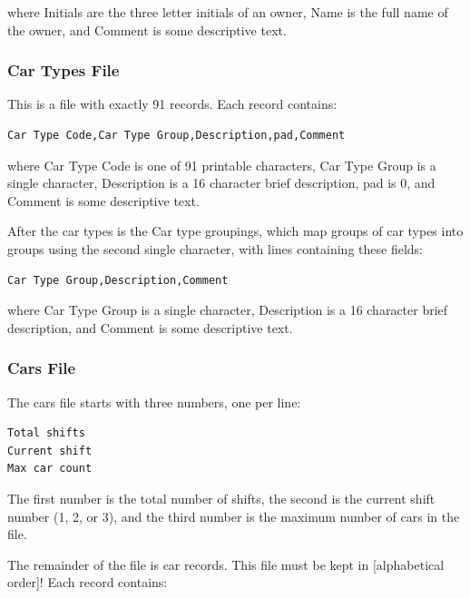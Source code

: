 where Initials are the three letter initials of an owner, Name is the
full name of the owner, and Comment is some descriptive text.

\subsubsection{Car Types File}

This is a file with exactly 91 records.  Each record contains:

\begin{verbatim}
Car Type Code,Car Type Group,Description,pad,Comment
\end{verbatim}

where Car Type Code is one of 91 printable characters, Car Type Group
is a single character, Description is a 16 character brief description,
pad is 0, and Comment is some descriptive text.

After the car types is the Car type groupings, which map groups of car
types into groups using the second single character, with lines
containing these fields:

\begin{verbatim}
Car Type Group,Description,Comment
\end{verbatim}

where Car Type Group is a single character, Description is a 16
character brief description, and Comment is some descriptive text.

\subsubsection{Cars File}

The cars file starts with three numbers, one per line:

\begin{verbatim}
Total shifts
Current shift
Max car count
\end{verbatim}

The first number is the total number of shifts, the second is the
current shift number (1, 2, or 3), and the third number is the maximum
number of cars in the file.

The remainder of the file is car records. This file must be kept in
[alphabetical order]! Each record contains:

